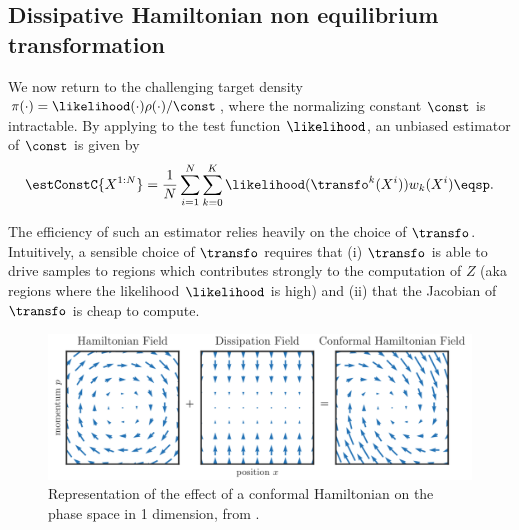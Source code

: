 \subsection{Dissipative Hamiltonian non equilibrium transformation}
\label{subsec:NISestimators}
We now return to the challenging target density $\pi(\cdot)= \likelihood(\cdot) \rho(\cdot)/\const$,
where the normalizing constant $\const$ is intractable.  
By applying  to
the test function $\likelihood$, an unbiased estimator of $\const$ is given by
\begin{equation}
  \label{eq:def_estimator_normal_const}
  \estConstC{X^{1:N}}=\frac{1}{N}\sum_{i=1}^{N}
  \sum_{k=0}^K\likelihood(\transfo^{k}(X^i))w_k(X^i) \eqsp.
\end{equation}

The efficiency of such an estimator relies heavily on the choice of $\transfo$. Intuitively, a sensible choice of
$\transfo$ requires that  (i) $\transfo$ is able to drive samples to regions which contributes strongly to the computation of $Z$ (aka regions where the likelihood $\likelihood$ is high) and (ii) that the Jacobian of $\transfo$ is cheap to compute. 
\begin{figure}[ht]
    \centering
    \includegraphics[width=\linewidth]{pics/conformal_hamiltonian.pdf}
    \caption{Representation of the effect of a conformal Hamiltonian on the phase space in 1 dimension, from \cite{maddison2018hamiltonian}.}
    \label{fig:conf_hamiltonian}
\end{figure}
